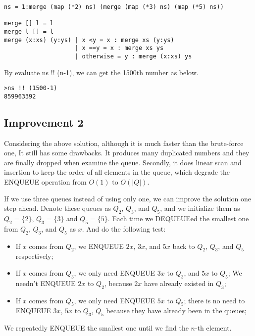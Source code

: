 \documentclass[UTF8]{article}
\begin{document}
\lstset{language=Haskell}
\begin{lstlisting}
ns = 1:merge (map (*2) ns) (merge (map (*3) ns) (map (*5) ns))

merge [] l = l
merge l [] = l
merge (x:xs) (y:ys) | x <y = x : merge xs (y:ys)
                    | x ==y = x : merge xs ys
                    | otherwise = y : merge (x:xs) ys
\end{lstlisting}

By evaluate ns !! (n-1), we can get the 1500th number as
below.

\begin{verbatim}
>ns !! (1500-1)
859963392
\end{verbatim}

\subsection{Improvement 2}
Considering the above solution, although it is much faster than the brute-force one,
It still has some drawbacks. It produces many duplicated numbers and they are
finally dropped when examine the queue. Secondly, it does linear scan and insertion
to keep the order of all elements in the queue, which degrade the ENQUEUE operation
from $O(1)$ to $O(|Q|)$.

If we use three queues instead of using only one, we can improve the solution one
step ahead. Denote these queues as $Q_2$, $Q_3$, and $Q_5$, and we initialize
them as $Q_2=\{ 2 \}$, $Q_3 = \{ 3\}$ and $Q_5 = \{ 5 \}$. Each time we DEQUEUEed
the smallest one from $Q_2$, $Q_3$, and $Q_5$ as $x$. And do the following test:

\begin{itemize}
\item If $x$ comes from $Q_2$, we ENQUEUE $2x$, $3x$, and $5x$ back to
$Q_2$, $Q_3$, and $Q_5$ respectively;
\item If $x$ comes from $Q_3$, we only need ENQUEUE $3x$ to $Q_3$, and $5x$ to $Q_5$;
We needn't ENQUEUE $2x$ to $Q_2$, because $2x$ have already existed in $Q_3$;
\item If $x$ comes from $Q_5$, we only need ENQUEUE $5x$ to $Q_5$; there is
no need to ENQUEUE $3x$, $5x$ to $Q_3$, $Q_5$ because they have already been
in the queues;
\end{itemize}

We repeatedly ENQUEUE the smallest one until we find the $n$-th element.
\end{document}
